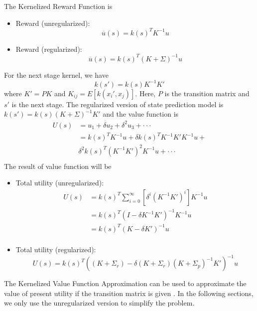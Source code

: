 The Kernelized Reward Function is
\begin{itemize}
	\item Reward (unregularized):
	\begin{equation}
	\overline{u}(s)=k(s)^{T}K^{-1}u
	\end{equation}
	\item Reward (regularized):
	\begin{equation}
	\overline{u}(s)=k(s)^{T}(K+\Sigma)^{-1}u
	\end{equation}	
\end{itemize}
For the next stage kernel, we have
\begin{equation}
k(s')=k(s)K^{-1}K'
\end{equation}
where $K'=PK$ and $K_{ij}=E[ k(x_{i}',x_{j})]$. Here, $P$ is the transition matrix and $s'$ is the next stage. The regularized version of state prediction model is 
$k(s')=k(s)(K+\Sigma)^{-1}K'$
and the value function is
\begin{equation}
\begin{split}
U(s) & =u_1 + \delta u_2 + \delta^{2} u_3 + \cdot \cdot \cdot \\
  & = k(s)^{T}K^{-1}u + \delta k(s)^{T}K^{-1}K'K^{-1}u + \\
  & \delta^{2} k(s)^{T}(K^{-1}K')^{2}K^{-1}u + \cdot \cdot \cdot \\
\end{split}
\end{equation}
The result of value function will be 
\begin{itemize}
\item Total utility (unregularized):
\begin{equation}
\begin{split}
U(s) & = k(s)^{T} \sum_{i=0}^{\infty} [\delta^{i} (K^{-1}K')^{i}]K^{-1} u \\
& = k(s)^{T}(I-\delta K^{-1}K')^{-1} K^{-1} u \\
& = k(s)^{T}(K-\delta K')^{-1} u \\
\end{split}
\end{equation}
\item Total utility (regularized):
\begin{equation}
U(s)=k(s)^{T}((K+\Sigma_{r})-\delta(K+\Sigma_{r})(K+\Sigma_{p})^{-1}K')^{-1}u
\end{equation}
\end{itemize}

The Kernelized Value Function Approximation can be used to approximate the value of present utility if the transition matrix is given \cite{ronaldparrgavintaylorchristopherpainterwakefieldlihonglimichaellittman, franciscos.melom.isabelribeiro2007, miloshauskrechtbranislavkveton}. In the following sections, we only use the unregularized version to simplify the problem.

